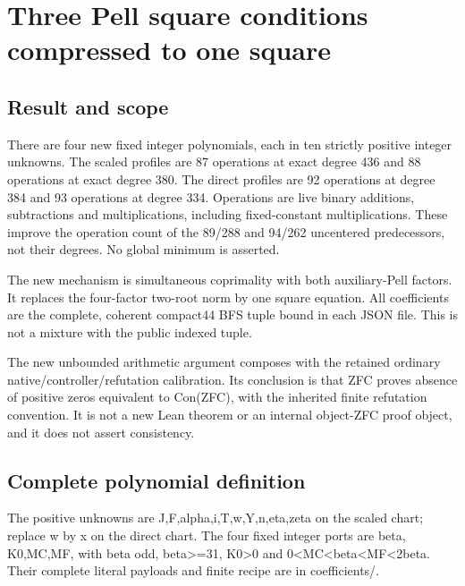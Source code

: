 \section{Three Pell square conditions compressed to one square}



\subsection{Result and scope}



There are four new fixed integer polynomials, each in ten strictly positive integer unknowns. The scaled profiles are 87 operations at exact degree 436 and 88 operations at exact degree 380. The direct profiles are 92 operations at degree 384 and 93 operations at degree 334. Operations are live binary additions, subtractions and multiplications, including fixed-constant multiplications. These improve the operation count of the 89/\allowbreak{}288 and 94/\allowbreak{}262 uncentered predecessors, not their degrees. No global minimum is asserted.



The new mechanism is simultaneous coprimality with both auxiliary-Pell factors. It replaces the four-factor two-root norm by one square equation. All coefficients are the complete, coherent compact44 BFS tuple bound in each JSON file. This is not a mixture with the public indexed tuple.



The new unbounded arithmetic argument composes with the retained ordinary native/\allowbreak{}controller/\allowbreak{}refutation calibration. Its conclusion is that ZFC proves absence of positive zeros equivalent to Con(ZFC), with the inherited finite refutation convention. It is not a new Lean theorem or an internal object-ZFC proof object, and it does not assert consistency.



\subsection{Complete polynomial definition}



The positive unknowns are J,F,alpha,i,T,w,Y,n,eta,zeta on the scaled chart; replace w by x on the direct chart. The four fixed integer ports are beta, K0,MC,MF, with beta odd, beta\textgreater{}\allowbreak{}=\allowbreak{}31, K0\textgreater{}\allowbreak{}0 and 0\textless{}\allowbreak{}MC\textless{}\allowbreak{}beta\textless{}\allowbreak{}MF\textless{}\allowbreak{}2beta. Their complete literal payloads and finite recipe are in coefficients/.



